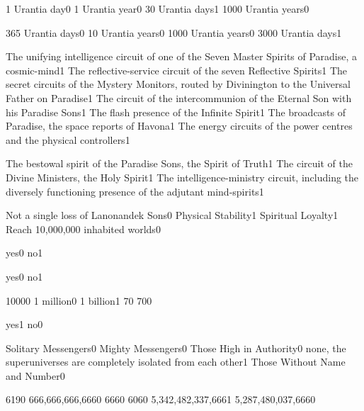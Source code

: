 {1 Urantia day}{0}
{1 Urantia year}{0}
{30 Urantia days}{1}
{1000 Urantia years}{0}
\qstop

{365 Urantia days}{0}
{10 Urantia years}{0}
{1000 Urantia years}{0}
{3000 Urantia days}{1}
\qstop

{The unifying intelligence circuit of one of the Seven Master Spirits of Paradise, a cosmic-mind}{1}
{The reflective-service circuit of the seven Reflective Spirits}{1}
{The secret circuits of the Mystery Monitors, routed by Divinington to the Universal Father on Paradise}{1}
{The circuit of the intercommunion of the Eternal Son with his Paradise Sons}{1}
{The flash presence of the Infinite Spirit}{1}
{The broadcasts of Paradise, the space reports of Havona}{1}
{The energy circuits of the power centres and the physical controllers}{1}
\qstop

{The bestowal spirit of the Paradise Sons, the Spirit of Truth}{1}
{The circuit of the Divine Ministers, the Holy Spirit}{1}
{The intelligence-ministry circuit, including the diversely functioning presence of the adjutant mind-spirits}{1}
\qstop

{Not a single loss of Lanonandek Sons}{0}
{Physical Stability}{1}
{Spiritual Loyalty}{1}
{Reach 10,000,000 inhabited worlds}{0}
\qstop

{yes}{0}
{no}{1}
\qstop

{yes}{0}
{no}{1}
\qstop

{1000}{0}
{1 million}{0}
{1 billion}{1}
{7}{0}
{70}{0}
\qstop

{yes}{1}
{no}{0}
\qstop

{Solitary Messengers}{0}
{Mighty Messengers}{0}
{Those High in Authority}{0}
{none, the superuniverses are completely isolated from each other}{1}
{Those Without Name and Number}{0}
\qstop

{619}{0}
{666,666,666,666}{0}
{666}{0}
{606}{0}
{5,342,482,337,666}{1}
{5,287,480,037,666}{0}
\qstop

